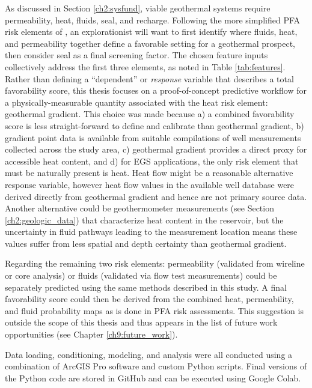 As discussed in Section \ref{ch2:sysfund}, viable geothermal systems require permeability, heat, fluids, seal, and recharge. Following the more simplified PFA risk elements of \citet{bielicki_hydrogeolgic_2015}, an explorationist will want to first identify where fluids, heat, and permeability together define a favorable setting for a geothermal prospect, then consider seal as a final screening factor. The chosen feature inputs collectively address the first three elements, as noted in Table \ref{tab:features}. Rather than defining a ``dependent'' or \textit{response} variable that describes a total favorability score, this thesis focuses on a proof-of-concept predictive workflow for a physically-measurable quantity associated with the heat risk element: geothermal gradient. This choice was made because a) a combined favorability score is less straight-forward to define and calibrate than geothermal gradient, b) gradient point data is available from suitable compilations of well measurements collected across the study area, c) geothermal gradient provides a direct proxy for accessible heat content, and d) for EGS applications, the only risk element that must be naturally present is heat. Heat flow might be a reasonable alternative response variable, however heat flow values in the available well database were derived directly from geothermal gradient and hence are not primary source data. Another alternative could be geothermometer measurements (see Section \ref{ch2:geologic_data}) that characterize heat content in the reservoir, but the uncertainty in fluid pathways leading to the measurement location means these values suffer from less spatial and depth certainty than geothermal gradient.

Regarding the remaining two risk elements: permeability (validated from wireline or core analysis) or fluids (validated via flow test measurements) could be separately predicted using the same methods described in this study. A final favorability score could then be derived from the combined heat, permeability, and fluid probability maps as is done in PFA risk assessments. This suggestion is outside the scope of this thesis and thus appears in the list of future work opportunities (see Chapter \ref{ch9:future_work}).

Data loading, conditioning, modeling, and analysis were all conducted using a combination of ArcGIS Pro software and custom Python scripts. Final versions of the Python code are stored in GitHub and can be executed using Google Colab.
\vfill

